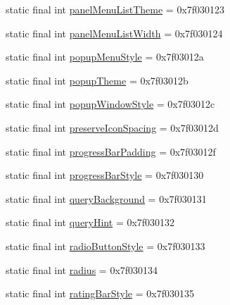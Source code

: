 \begin{DoxyCompactItemize}
\item 
static final int \mbox{\hyperlink{classcom_1_1synnapps_1_1carouselview_1_1_r_1_1attr_a0112756ad5e1bb25eff40e4ebdf16973}{panel\+Menu\+List\+Theme}} = 0x7f030123
\item 
static final int \mbox{\hyperlink{classcom_1_1synnapps_1_1carouselview_1_1_r_1_1attr_a08fdd84c25fb5a8b4d8231342e75cc38}{panel\+Menu\+List\+Width}} = 0x7f030124
\item 
static final int \mbox{\hyperlink{classcom_1_1synnapps_1_1carouselview_1_1_r_1_1attr_acc10113cfe69fcdaf76c112f96677893}{popup\+Menu\+Style}} = 0x7f03012a
\item 
static final int \mbox{\hyperlink{classcom_1_1synnapps_1_1carouselview_1_1_r_1_1attr_ae814d180618ba585d020df86e639fc35}{popup\+Theme}} = 0x7f03012b
\item 
static final int \mbox{\hyperlink{classcom_1_1synnapps_1_1carouselview_1_1_r_1_1attr_a1c51582a9666a99c095e3bb1ffe0e2cb}{popup\+Window\+Style}} = 0x7f03012c
\item 
static final int \mbox{\hyperlink{classcom_1_1synnapps_1_1carouselview_1_1_r_1_1attr_a8f09c02c70f2beef3a8ed0d18a2a4403}{preserve\+Icon\+Spacing}} = 0x7f03012d
\item 
static final int \mbox{\hyperlink{classcom_1_1synnapps_1_1carouselview_1_1_r_1_1attr_a3d38f16cac98567bc43af96df26cdcde}{progress\+Bar\+Padding}} = 0x7f03012f
\item 
static final int \mbox{\hyperlink{classcom_1_1synnapps_1_1carouselview_1_1_r_1_1attr_a67b83260375bc017d2a0b19cf4d7a043}{progress\+Bar\+Style}} = 0x7f030130
\item 
static final int \mbox{\hyperlink{classcom_1_1synnapps_1_1carouselview_1_1_r_1_1attr_a9635f049f0fab5e83ee4dbf5cc2714e8}{query\+Background}} = 0x7f030131
\item 
static final int \mbox{\hyperlink{classcom_1_1synnapps_1_1carouselview_1_1_r_1_1attr_aa1cefb74fd50ea690c8e4af30a91fd71}{query\+Hint}} = 0x7f030132
\item 
static final int \mbox{\hyperlink{classcom_1_1synnapps_1_1carouselview_1_1_r_1_1attr_a79c0230f7d446e25bdb239e31de8bdfa}{radio\+Button\+Style}} = 0x7f030133
\item 
static final int \mbox{\hyperlink{classcom_1_1synnapps_1_1carouselview_1_1_r_1_1attr_ae15d720df8e826f8ea585660f58efb69}{radius}} = 0x7f030134
\item 
static final int \mbox{\hyperlink{classcom_1_1synnapps_1_1carouselview_1_1_r_1_1attr_ae2f70c4e26c59615c502ca081a29ee2d}{rating\+Bar\+Style}} = 0x7f030135

\end{DoxyCompactItemize}
